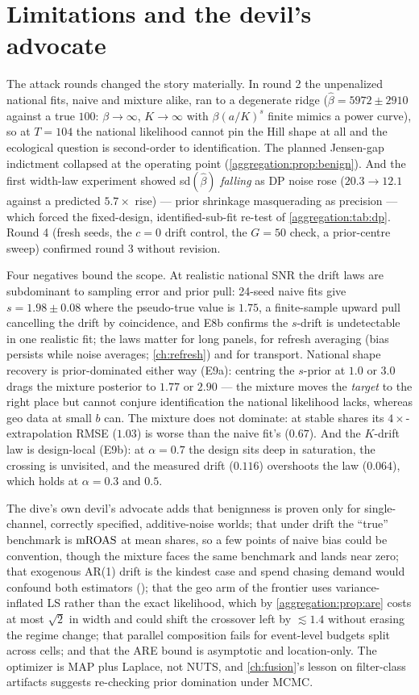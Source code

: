 \section{Limitations and the devil's advocate}

The attack rounds changed the story materially. In round 2 the unpenalized national fits, naive and mixture alike, ran to a degenerate ridge ($\hat\beta = 5972 \pm 2910$ against a true $100$: $\beta \to \infty$, $K \to \infty$ with $\beta(a/K)^s$ finite mimics a power curve), so at $T = 104$ the national likelihood cannot pin the Hill shape at all and the ecological question is second-order to identification. The planned Jensen-gap indictment collapsed at the operating point (\cref{aggregation:prop:benign}). And the first width-law experiment showed sd$(\hat\beta)$ \emph{falling} as DP noise rose ($20.3 \to 12.1$ against a predicted $5.7\times$ rise) --- prior shrinkage masquerading as precision --- which forced the fixed-design, identified-sub-fit re-test of \cref{aggregation:tab:dp}. Round 4 (fresh seeds, the $c = 0$ drift control, the $G = 50$ check, a prior-centre sweep) confirmed round 3 without revision.

Four negatives bound the scope. At realistic national SNR the drift laws are subdominant to sampling error and prior pull: 24-seed naive fits give $s = 1.98 \pm 0.08$ where the pseudo-true value is $1.75$, a finite-sample upward pull cancelling the drift by coincidence, and E8b confirms the $s$-drift is undetectable in one realistic fit; the laws matter for long panels, for refresh averaging (bias persists while noise averages; \cref{ch:refresh}) and for transport. National shape recovery is prior-dominated either way (E9a): centring the $s$-prior at $1.0$ or $3.0$ drags the mixture posterior to $1.77$ or $2.90$ --- the mixture moves the \emph{target} to the right place but cannot conjure identification the national likelihood lacks, whereas geo data at small $b$ can. The mixture does not dominate: at stable shares its $4\times$-extrapolation RMSE ($1.03$) is worse than the naive fit's ($0.67$). And the $K$-drift law is design-local (E9b): at $\alpha = 0.7$ the design sits deep in saturation, the crossing is unvisited, and the measured drift ($0.116$) overshoots the law ($0.064$), which holds at $\alpha = 0.3$ and $0.5$.

The dive's own devil's advocate adds that benignness is proven only for single-channel, correctly specified, additive-noise worlds; that under drift the ``true'' benchmark is $\mathrm{mROAS}$ at mean shares, so a few points of naive bias could be convention, though the mixture faces the same benchmark and lands near zero; that exogenous AR(1) drift is the kindest case and spend chasing demand would confound both estimators (); that the geo arm of the frontier uses variance-inflated LS rather than the exact likelihood, which by \cref{aggregation:prop:are} costs at most $\sqrt2$ in width and could shift the crossover left by $\lesssim 1.4$ without erasing the regime change; that parallel composition fails for event-level budgets split across cells; and that the ARE bound is asymptotic and location-only. The optimizer is MAP plus Laplace, not NUTS, and \cref{ch:fusion}'s lesson on filter-class artifacts suggests re-checking prior domination under MCMC.

